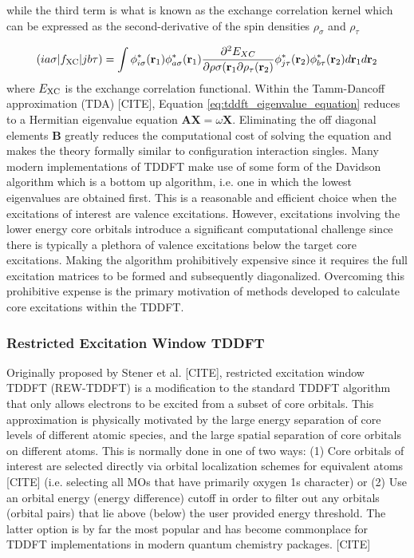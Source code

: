 \documentclass[final]{emory}
\begin{document}
while the third term is what is known as the exchange correlation kernel which can be expressed as the second-derivative of the spin densities $\rho_{\sigma}$ and $\rho_{\tau}$

\begin{equation}
(ia\sigma|f_{\rm XC}|jb\tau) = \int \phi^*_{i\sigma}(\mathbf{r}_1)  \phi^*_{a\sigma}(\mathbf{r}_1) \frac{\partial^2 E_{XC}}{\partial \rho{\sigma}(\mathbf{r}_1 \partial \rho_{\tau}(\mathbf{r}_2)} \phi^*_{j\tau}(\mathbf{r}_2) \phi^*_{b\tau}(\mathbf{r}_2) d\mathbf{r}_1 d\mathbf{r}_2
\end{equation}
where $E_{\rm XC}$ is the exchange correlation functional. Within the Tamm-Dancoff approximation (TDA) [CITE], Equation \ref{eq:tddft_eigenvalue_equation} reduces to a Hermitian eigenvalue equation $\mathbf{A}\mathbf{X} = \omega\mathbf{X}$. Eliminating the off diagonal elements $\mathbf{B}$ greatly reduces the computational cost of solving the equation and makes the theory formally similar to configuration interaction singles. Many modern implementations of TDDFT make use of some form of the Davidson algorithm which is a bottom up algorithm, i.e. one in which the lowest eigenvalues are obtained first. This is a reasonable and efficient choice when the excitations of interest are valence excitations. However, excitations involving the lower energy core orbitals introduce a significant computational challenge since there is typically a plethora of valence excitations below the target core excitations. Making the algorithm prohibitively expensive since it requires the full excitation matrices to be formed and subsequently diagonalized. Overcoming this prohibitive expense is the primary motivation of methods developed to calculate core excitations within the TDDFT. 
\subsubsection{Restricted Excitation Window TDDFT}
Originally proposed by Stener et al. [CITE], restricted excitation window TDDFT (REW-TDDFT) is a modification to the standard TDDFT algorithm that only allows electrons to be excited from a subset of core orbitals. This approximation is physically motivated by the large energy separation of core levels of different atomic species, and the large spatial separation of core orbitals on different atoms. This is normally done in one of two ways: (1) Core orbitals of interest are selected directly via orbital localization schemes for equivalent atoms [CITE] (i.e. selecting all MOs that have primarily oxygen 1s character) or (2) Use an orbital energy (energy difference) cutoff in order to filter out any orbitals (orbital pairs) that lie above (below) the user provided energy threshold. The latter option is by far the most popular and has become commonplace for TDDFT implementations in modern quantum chemistry packages. [CITE] 
\end{document}

